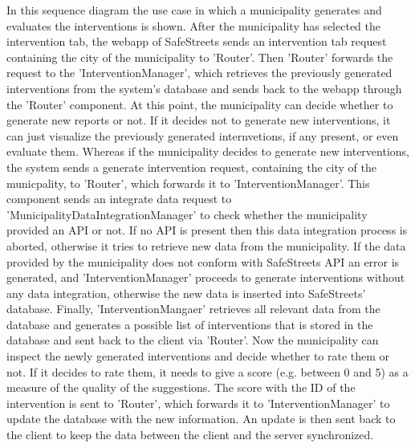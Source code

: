 In this sequence diagram the use case in which a municipality generates and evaluates the interventions is shown. After the municipality has selected the intervention tab, the webapp of SafeStreets sends an intervention tab request containing the city of the municipality to 'Router'. Then 'Router' forwards the request to the 'InterventionManager', which retrieves the previously generated interventions from the system's database and sends back to the webapp through the 'Router' component. At this point, the municipality can decide whether to generate new reports or not. If it decides not to generate new interventions, it can just visualize the previously generated internvetions, if any present, or even evaluate them. Whereas if the municipality decides to generate new interventions, the system sends a generate intervention request, containing the city of the municpality, to 'Router', which forwards it to 'InterventionManager'. This component sends an integrate data request to 'MunicipalityDataIntegrationManager' to check whether the municipality provided an API or not. If no API is present then this data integration process is aborted, otherwise it tries to retrieve new data from the municipality. If the data provided by the municipality does not conform with SafeStreets API an error is generated, and 'InterventionManager' proceeds to generate interventions without any data integration, otherwise the new data is inserted into SafeStreets' database. Finally, 'InterventionMangaer' retrieves all relevant data from the database and generates a possible list of interventions that is stored in the database and sent back to the client via 'Router'. Now the municipality can inspect the newly generated interventions and decide whether to rate them or not. If it decides to rate them, it needs to give a score (e.g. between 0 and 5) as a measure of the quality of the suggestions. The score with the ID of the intervention is sent to 'Router', which forwards it to 'InterventionManager' to update the database with the new information. An update is then sent back to the client to keep the data between the client and the server synchronized.	
